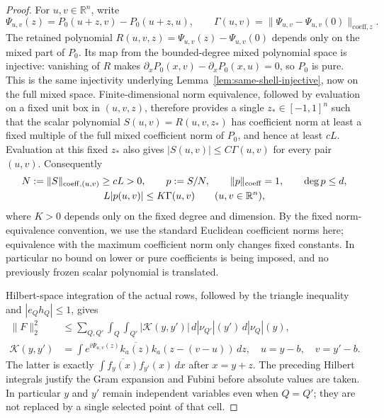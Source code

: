 \documentclass[11pt]{article}
\numberwithin{equation}{section}
\theoremstyle{remark}
\theoremstyle{definition}
\newcommand{\R}{\mathbb R}
\newcommand{\norm}[1]{\lVert #1\rVert}
\begin{document}
\begin{proof}
For $u,v\in\R^n$, write
\[
 \Psi_{u,v}(z)=P_0(u+z,v)-P_0(u+z,u),\qquad
 \Gamma(u,v)=\norm{\Psi_{u,v}-\Psi_{u,v}(0)}_{\mathrm{coeff},z}.
\]
The retained polynomial
$R(u,v,z)=\Psi_{u,v}(z)-\Psi_{u,v}(0)$ depends only on the mixed
part of $P_0$.  Its map from the bounded-degree mixed polynomial space
is injective: vanishing of $R$ makes
$\partial_xP_0(x,v)-\partial_xP_0(x,u)=0$, so $P_0$ is pure.
This is the same injectivity underlying
Lemma~\ref{lem:same-shell-injective}, now on the full mixed space.
Finite-dimensional norm equivalence, followed by evaluation on a fixed
unit box in $(u,v,z)$, therefore provides a single $z_*\in[-1,1]^n$
such that the scalar polynomial $S(u,v)=R(u,v,z_*)$ has coefficient norm
at least a fixed multiple of the full mixed coefficient norm of $P_0$,
and hence at least $cL$.  Evaluation at this fixed $z_*$ also gives
$|S(u,v)|\le C\Gamma(u,v)$ for every pair $(u,v)$.  Consequently
\begin{equation}\label{eq:flat-double-coefficient-norm}
 \begin{gathered}
 N:=\norm S_{\mathrm{coeff},(u,v)}\ge cL>0,
 \qquad p:=S/N,\qquad\norm p_{\rm coeff}=1,\qquad\deg p\le d,\\
 L|p(u,v)|\le K\Gamma(u,v)\qquad(u,v\in\R^n),
 \end{gathered}
\end{equation}
where $K>0$ depends only on the fixed degree and dimension.
By the fixed norm-equivalence convention, we use the standard Euclidean
coefficient norms here; equivalence with the maximum coefficient norm
only changes fixed constants.  In particular no bound on lower or pure coefficients is
being imposed, and no previously frozen scalar polynomial is translated.

Hilbert-space integration of the actual rows, followed by the triangle
inequality and $|e_Qh_Q|\le1$, gives
\begin{align}
 \norm F_2^2
 &\le\sum_{Q,Q'}\int_Q\int_{Q'}|\mathcal K(y,y')|
       \,d|\nu_{Q'}|(y')\,d|\nu_Q|(y),
 \label{eq:flat-atomic-square}\\
 \mathcal K(y,y')
 &=\int e^{i\Psi_{u,v}(z)}\overline{k_a(z)}
                k_a(z-(v-u))\,dz,
 \quad u=y-b,\quad v=y'-b.
 \label{eq:flat-atomic-correlation}
\end{align}
The latter is exactly $\int\overline{f_y(x)}f_{y'}(x)\,dx$ after
$x=y+z$.
The preceding Hilbert integrals justify the Gram expansion and Fubini
before absolute values are taken.  In particular $y$ and $y'$ remain
independent variables even when $Q=Q'$; they are not replaced by a
single selected point of that cell.


\end{proof}
\end{document}
